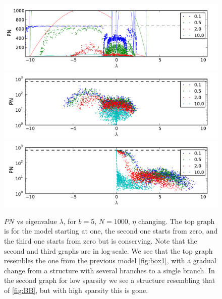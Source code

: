 \documentclass[onecolumn,fleqn,longbibliography]{revtex4}
\begin{document}
\begin{figure}[H]
    \includegraphics{pta_exp_low}\\
    \includegraphics{pta_exp_from_zero_low}
    \includegraphics{pta_exp_from_zero_cons}
    \caption{$PN$ vs eigenvalue $\lambda$, for $b=5$, $N=1000$, $\eta$ changing. 
    The top graph is for the model starting at one, the second one starts from zero,
    and the third one starts from zero but is conserving.
    Note that the second and third graphs are in log-scale. We see that the top graph
    resembles the one from the previous model \autoref{fig:box1}, with 
    a gradual change from a structure with several branches to a single branch.
    In the second graph for low sparsity we see a structure 
    resembling that of \autoref{fig:BB}, but with high sparsity this is gone.}
    \label{fig:exp}
\end{figure}



\end{document}
